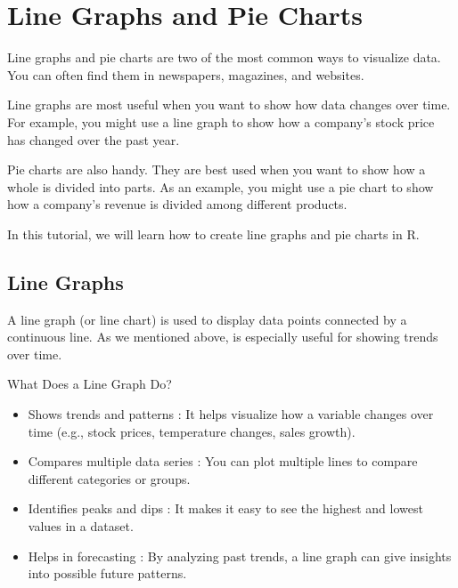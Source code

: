 \documentclass[
  letterpaper,
  DIV=11,
  numbers=noendperiod]{scrreprt}
\providecommand{\tightlist}{%
  \setlength{\itemsep}{0pt}\setlength{\parskip}{0pt}}\usepackage{longtable,booktabs,array}
\begin{document}

\chapter*{Line Graphs and Pie Charts}\label{line-graphs-and-pie-charts}


Line graphs and pie charts are two of the most common ways to visualize
data. You can often find them in newspapers, magazines, and websites.

Line graphs are most useful when you want to show how data changes over
time. For example, you might use a line graph to show how a company's
stock price has changed over the past year.

Pie charts are also handy. They are best used when you want to show how
a whole is divided into parts. As an example, you might use a pie chart
to show how a company's revenue is divided among different products.

In this tutorial, we will learn how to create line graphs and pie charts
in R.

\section*{Line Graphs}\label{line-graphs}


A line graph (or line chart) is used to display data points connected by
a continuous line. As we mentioned above, is especially useful for
showing trends over time.

What Does a Line Graph Do?

\begin{itemize}
\tightlist
\item
  Shows trends and patterns : It helps visualize how a variable changes
  over time (e.g., stock prices, temperature changes, sales growth).
\item
  Compares multiple data series : You can plot multiple lines to compare
  different categories or groups.
\item
  Identifies peaks and dips : It makes it easy to see the highest and
  lowest values in a dataset.
\item
  Helps in forecasting : By analyzing past trends, a line graph can give
  insights into possible future patterns.
\end{itemize}
\end{document}
